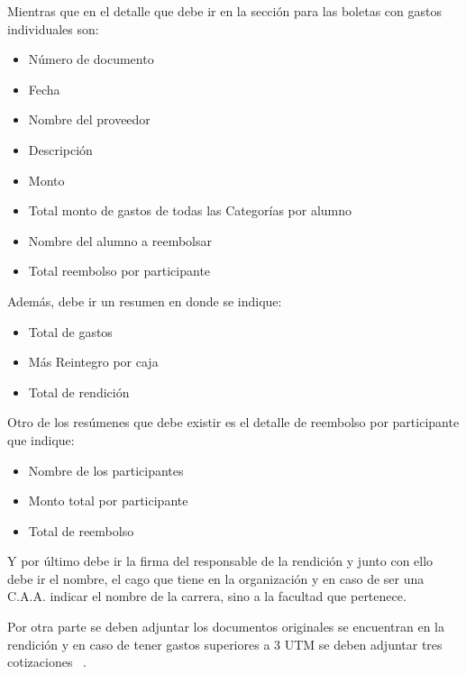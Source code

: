   Mientras que en el detalle que debe ir en la sección para las boletas con gastos individuales son:
  
  \begin{itemize}
    \item Número de documento
    \item Fecha
    \item Nombre del proveedor
    \item Descripción
    \item Monto
    \item Total monto de gastos de todas las Categorías por alumno
    \item Nombre del alumno a reembolsar
    \item Total reembolso por participante
  \end{itemize}
  
  Además, debe ir un resumen en donde se indique:
  
  \begin{itemize}
    \item Total de gastos
    \item Más Reintegro por caja
    \item Total de rendición
  \end{itemize}
  
  Otro de los resúmenes que debe existir es el detalle de reembolso por participante que indique:
  
  \begin{itemize}
    \item Nombre de los participantes
    \item Monto total por participante
    \item Total de reembolso
  \end{itemize}
  
  Y por último debe ir la firma del responsable de la rendición y junto con ello debe ir el nombre, el cago que tiene en la organización y en caso de ser una C.A.A. indicar el nombre de la carrera, sino a la facultad que pertenece.
  
  Por otra parte se deben adjuntar los documentos originales se encuentran en la rendición y en caso de tener gastos superiores a 3 UTM se deben adjuntar tres cotizaciones ~\cite{5}.
  
  